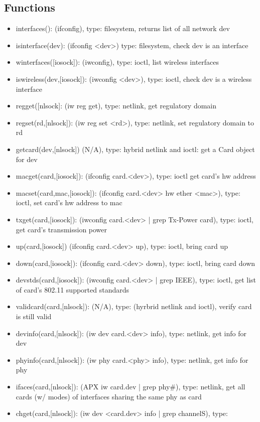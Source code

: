 \documentclass[11pt]{article}
\begin{document}
\begin{appendices}
\subsection{Functions}
\begin{itemize}
\item interfaces(): (ifconfig), type: filesystem, returns list of all network dev
\item isinterface(dev): (ifconfig <dev>) type: filesystem, check dev is an interface
\item winterfaces([iosock]): (iwconfig), type: ioctl, list wireless interfaces
\item iswireless(dev,[iosock]): (iwconfig <dev>), type: ioctl, check dev is a 
wireless interface
\item regget([nlsock]: (iw reg get), type: netlink, get regulatory domain
\item regset(rd,[nlsock]): (iw reg set <rd>), type: netlink, set regulatory domain 
to rd
\item getcard(dev,[nlsock]) (N/A), type: hybrid netlink and ioctl: get a Card 
object for dev
\item macget(card,[iosock]): (ifconfig card.<dev>), type: ioctl get card's hw
address
\item macset(card,mac,[iosock]): (ifconfig card.<dev> hw ether <mac>), type: 
ioctl, set card's hw address to mac
\item txget(card,[iosock]): (iwconfig card.<dev> | grep Tx-Power card), type: 
ioctl, get card's transmission power
\item up(card,[iosock]) (ifconfig card.<dev> up), type: ioctl, bring card up
\item down(card,[iosock]): (ifconfig card.<dev> down), type: ioctl, bring card 
down
\item devstds(card,[iosock]): (iwconfig card.<dev> | grep IEEE), type: ioctl, get
list of card's 802.11 supported standards
\item validcard(card,[nlsock]): (N/A), type: (hyrbrid netlink and ioctl), verify
card is still valid
\item devinfo(card,[nlsock]): (iw dev card.<dev> info), type: netlink, get info 
for dev 
\item phyinfo(card,[nlsock]): (iw phy card.<phy> info), type: netlink, get info
for phy
\item ifaces(card,[nlsock]): (APX iw card.dev | grep phy\#), type: netlink, get all
cards (w/ modes) of interfaces sharing the same phy as card
\item chget(card,[nlsock]): (iw dev <card.dev> info | grep channelS), type: 

\end{itemize}
\end{appendices}
\end{document}
